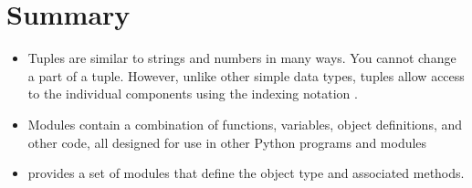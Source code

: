 \documentclass[letterpaper,10pt,english]{sphinxmanual}
\begin{document}
\begin{itemize}
\begin{sphinxVerbatim}[commandchars=\\\{\}]
 
 
 
\end{sphinxVerbatim}

\end{itemize}


\section{Summary}
\label{\detokenize{lecture_notes/lec07_modules_images:summary}}\begin{itemize}
\item {} 
Tuples are similar to strings and numbers in many ways. You cannot
change a part of a tuple. However, unlike other simple data types,
tuples allow access to the individual components using the indexing
notation \sphinxcode{\sphinxupquote{{[} {]}}}.

\item {} 
Modules contain a combination of functions, variables, object
definitions, and other code, all designed for use in other Python
programs and modules

\item {} 
 provides a set of modules that define the  object
type and associated methods.

\end{itemize}
\end{document}
